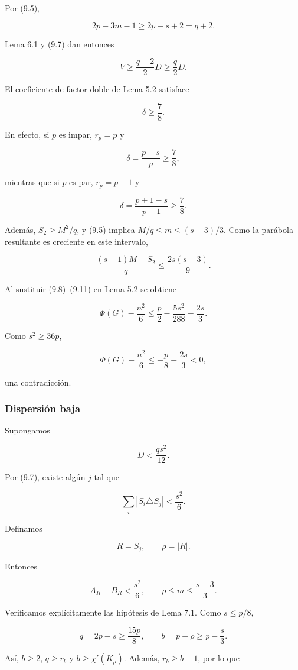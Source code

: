 \documentclass[
  11pt,
]{article}
\begin{document}
Por (9.5),

\[
2p-3m-1\ge2p-s+2=q+2.
\]

Lema 6.1 y (9.7) dan entonces

\[
V
\ge
\frac{q+2}{2}D
\ge
\frac q2D.
\tag{9.9}
\]

El coeficiente de factor doble de Lema 5.2 satisface

\[
\boxed{\delta\ge\frac78.}
\tag{9.10}
\]

En efecto, si \(p\) es impar, \(r_p=p\) y

\[
\delta=\frac{p-s}{p}\ge\frac78,
\]

mientras que si \(p\) es par, \(r_p=p-1\) y

\[
\delta=\frac{p+1-s}{p-1}\ge\frac78.
\]

Además, \(S_2\ge M^2/q\), y (9.5) implica \(M/q\le m\le(s-3)/3\). Como
la parábola resultante es creciente en este intervalo,

\[
\frac{(s-1)M-S_2}{q}
\le
\frac{2s(s-3)}9.
\tag{9.11}
\]

Al sustituir (9.8)--(9.11) en Lema 5.2 se obtiene

\[
\Phi(G)-\frac{n^2}{6}
\le
\frac p2-\frac{5s^2}{288}-\frac{2s}{3}.
\tag{9.12}
\]

Como \(s^2\ge36p\),

\[
\Phi(G)-\frac{n^2}{6}
\le
-\frac p8-\frac{2s}{3}<0,
\]

una contradicción.

\subsubsection{Dispersión baja}\label{dispersiuxf3n-baja}

Supongamos

\[
D<\frac{qs^2}{12}.
\tag{9.13}
\]

Por (9.7), existe algún \(j\) tal que

\[
\sum_i|S_i\triangle S_j|
<
\frac{s^2}{6}.
\tag{9.14}
\]

Definamos

\[
R=S_j,
\qquad
\rho=|R|.
\]

Entonces

\[
A_R+B_R<\frac{s^2}{6},
\qquad
\rho\le m\le\frac{s-3}{3}.
\tag{9.15}
\]

Verificamos explícitamente las hipótesis de Lema 7.1. Como \(s\le p/8\),

\[
q=2p-s\ge\frac{15p}{8},
\qquad
b=p-\rho\ge p-\frac s3.
\]

Así, \(b\ge2\), \(q\ge r_b\) y \(b\ge\chi'(K_\rho)\). Además,
\(r_b\ge b-1\), por lo que
\end{document}
